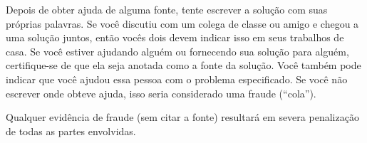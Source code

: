 \documentclass[a4paper,12pt]{scrartcl}
\begin{document}
Depois de obter ajuda de alguma fonte, tente escrever a solução com suas
próprias palavras. Se você discutiu com um colega de classe ou amigo e chegou a
uma solução juntos, então vocês dois devem indicar isso em seus trabalhos de
casa. Se você estiver ajudando alguém ou fornecendo sua solução para alguém,
certifique-se de que ela seja anotada como a fonte da solução. Você também pode
indicar que você ajudou essa pessoa com o problema especificado. Se você não
escrever onde obteve ajuda, isso seria considerado uma fraude (``cola'').

Qualquer evidência de fraude (sem citar a fonte) resultará em severa
penalização de todas as partes envolvidas.
\end{document}
